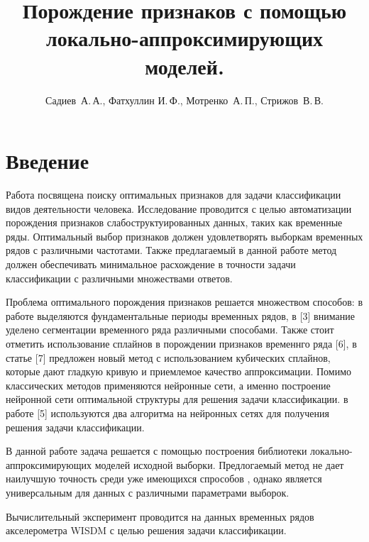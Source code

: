 \documentclass[12pt,twoside]{article}
\title
    [Порождение признаков с помощью локально-аппроксимирующих моделей.]
    {Порождение признаков с помощью локально-аппроксимирующих моделей.}
\author
    [Садиев~А.\,А., Фатхуллин И.\,Ф. ] %
    {Садиев~А.\,А., Фатхуллин И.\,Ф., Мотренко~А.\,П., Стрижов~В.\,В.} %
    [Садиев~А.\,А.$^1$,Фатхуллин И.\,Ф.$^1$, Мотренко~А.\,П.$^1$, Стрижов~В.\,В.$^1$] %
\begin{document}
\maketitle
\section{Введение}
Работа посвящена поиску оптимальных признаков для задачи классификации видов деятельности человека. Исследование проводится с целью автоматизации порождения признаков слабоструктуированных данных, таких как временные ряды. Оптимальный выбор признаков должен удовлетворять выборкам временных рядов с различными частотами. Также предлагаемый в данной работе метод должен обеспечивать минимальное расхождение в точности задачи классификации с различными множествами ответов.

Проблема оптимального порождения признаков решается множеством способов: в работе \cite{journals/titb/MotrenkoS16} выделяются фундаментальные периоды временных рядов, в [3]\cite{journals/titb/KarStr16} внимание уделено сегментации временного ряда различными способами. Также стоит отметить использование сплайнов в порождении признаков временнго ряда [6], в статье [7] предложен новый метод с использованием кубических сплайнов, которые дают гладкую кривую и приемлемое качество аппроксимации. Помимо классических методов применяются нейронные сети, а именно построение нейронной сети оптимальной структуры для решения задачи классификации. в работе [5] используются два алгоритма на нейронных сетях для получения решения задачи классификации.

В данной работе задача решается с помощью построения библиотеки локально-аппроксимирующих моделей исходной выборки. Предлогаемый метод не дает наилучшую точность среди уже имеющихся спрособов , однако является универсальным для данных с различными параметрами выборок.

Вычислительный эксперимент проводится на данных временных рядов акселерометра WISDM с целью решения задачи классификации.
\end{document}
